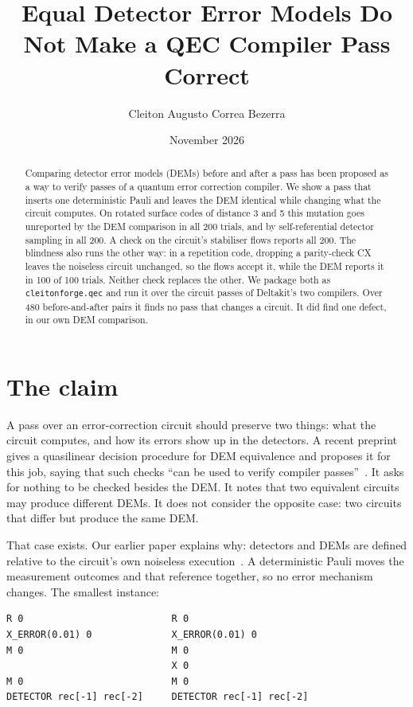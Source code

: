 \documentclass[10pt]{article}
\title{\textbf{Equal Detector Error Models Do Not Make a QEC Compiler Pass Correct}}
\author{Cleiton Augusto Correa Bezerra}
\affil{Independent Researcher\\
\texttt{augusto.cleiton@gmail.com}}
\date{November 2026}
\begin{document}
\maketitle

\begin{abstract}
Comparing detector error models (DEMs) before and after a pass has been
proposed as a way to verify passes of a quantum error correction compiler. We
show a pass that inserts one deterministic Pauli and leaves the DEM identical
while changing what the circuit computes. On rotated surface codes of distance 3
and 5 this mutation goes unreported by the DEM comparison in all 200 trials,
and by self-referential detector sampling in all 200. A check on the circuit's
stabiliser flows reports all 200. The blindness also runs the other way: in a
repetition code, dropping a parity-check CX leaves the noiseless circuit
unchanged, so the flows accept it, while the DEM reports it in 100 of 100
trials. Neither check replaces the other. We package both as
\texttt{cleitonforge.qec} and run it over the circuit passes of Deltakit's two
compilers. Over 480 before-and-after pairs it finds no pass that changes a
circuit. It did find one defect, in our own DEM comparison.
\end{abstract}

\section{The claim}

A pass over an error-correction circuit should preserve two things: what the
circuit computes, and how its errors show up in the detectors. A recent preprint
gives a quasilinear decision procedure for DEM equivalence and proposes it for
this job, saying that such checks ``can be used to verify compiler
passes''~\cite{rennela2026}. It asks for nothing to be checked besides the DEM.
It notes that two equivalent circuits may produce different DEMs. It does not
consider the opposite case: two circuits that differ but produce the same DEM.

That case exists. Our earlier paper explains why: detectors and DEMs are defined
relative to the circuit's own noiseless execution~\cite{bezerra2026}. A
deterministic Pauli moves the measurement outcomes and that reference
together, so no error mechanism changes. The smallest instance:

\begin{lstlisting}[columns=fixed]
R 0                          R 0
X_ERROR(0.01) 0              X_ERROR(0.01) 0
M 0                          M 0
                             X 0
M 0                          M 0
DETECTOR rec[-1] rec[-2]     DETECTOR rec[-1] rec[-2]
\end{lstlisting}
\end{document}
